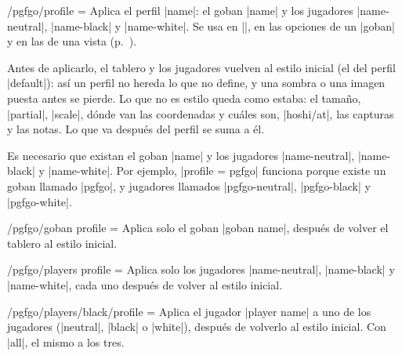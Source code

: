 \begin{key}{/pgfgo/profile = }
	Aplica el perfil |name|: el goban |name| y los jugadores |name-neutral|, |name-black| y |name-white|. Se usa en |\pgfgoset|, en las opciones de un |goban| y en las de una vista (p.~\pageref{subsec:vistas}).

	Antes de aplicarlo, el tablero y los jugadores vuelven al estilo inicial (el del perfil |default|): así un perfil no hereda lo que no define, y una sombra o una imagen puesta antes se pierde. Lo que no es estilo queda como estaba: el tamaño, |partial|, |scale|, dónde van las coordenadas y cuáles son, |hoshi/at|, las capturas y las notas. Lo que va después del perfil se suma a él.

	\begin{codeexample}[width=3cm]
		\begin{goban}[3, profile = default]
		\end{goban}
	\end{codeexample}

	Es necesario que existan el goban |name| y los jugadores |name-neutral|, |name-black| y |name-white|. Por ejemplo, |profile = pgfgo| funciona porque existe un goban llamado |pgfgo|, y jugadores llamados |pgfgo-neutral|, |pgfgo-black| y |pgfgo-white|.
\end{key}

\begin{key}{/pgfgo/goban profile = }
	Aplica solo el goban |goban name|, después de volver el tablero al estilo inicial.
\end{key}

\begin{key}{/pgfgo/players profile = }
	Aplica solo los jugadores |name-neutral|, |name-black| y |name-white|, cada uno después de volver al estilo inicial.

	\begin{codeexample}[]
		\begin{goban}[3, goban profile = pgfgo]
		\end{goban}

		\begin{goban}[3, players profile = pgfgo]
		\end{goban}
	\end{codeexample}
\end{key}

\begin{key}{/pgfgo/players/black/profile = }
	Aplica el jugador |player name| a uno de los jugadores (|neutral|, |black| o |white|), después de volverlo al estilo inicial. Con |all|, el mismo a los tres.
	\begin{codeexample}
	\end{codeexample}
\end{key}

